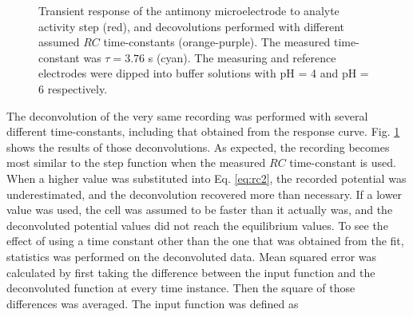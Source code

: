 \begin{figure}
\centering
{}
\caption[]{Transient response of the antimony microelectrode to analyte activity step (red), and decovolutions performed with different assumed $RC$ time-constants (orange-purple).
The measured time-constant was $\tau = 3.76$ s (cyan).
The measuring and reference electrodes were dipped into buffer solutions with pH = 4 and pH = 6 respectively.}
\label{fig:deconvoluted_transient}
\end{figure}

The deconvolution of the very same recording was performed with several different time-constants, including that obtained from the response curve.
Fig. \ref{fig:deconvoluted_transient} shows the results of those deconvolutions.
As expected, the recording becomes most similar to the step function when the measured $RC$ time-constant is used.
When a higher value was substituted into Eq. \ref{eq:rc2}, the recorded potential was underestimated, and the deconvolution recovered more than necessary.
If a lower value was used, the cell was assumed to be faster than it actually was, and the deconvoluted potential values did not reach the equilibrium values.
To see the effect of using a time constant other than the one that was obtained from the fit, statistics was performed on the deconvoluted data.
Mean squared error was calculated by first taking the difference between the input function and the deconvoluted function at every time instance.
Then the square of those differences was averaged.
The input function was defined as 

